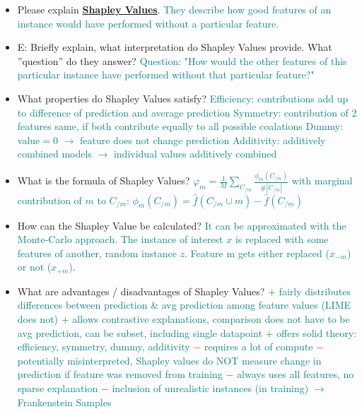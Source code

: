 \documentclass{report}
\newcommand{\asw}[2][teal]{}
\renewcommand{\asw}[2][teal]{\textcolor{#1}{#2}}
\begin{document}
\begin{itemize}
	\item Please explain \textbf{\underline{Shapley Values}}.
	\asw{\newline They describe how good features of an instance would have performed without a particular feature.}
	\item E: Briefly explain, what interpretation do Shapley Values provide. What ”question” do they answer?
	\asw{\newline Question: "How would the other features of this particular instance have performed without that particular feature?"}
	\item What properties do Shapley Values satisfy?
	\asw{\newline Efficiency: contributions add up to difference of prediction and average prediction
		\newline Symmetry: contribution of 2 features same, if both contribute equally to all possible coalations
		\newline Dummy: value$=0$ $\rightarrow$ feature does not change prediction
		\newline Additivity: additively combined models $\rightarrow$ individual values additively combined}
	\item What is the formula of Shapley Values?
	\asw{\newline $\varphi_m = \frac{1}{M} \sum_{C_{/m}} \frac{\phi_m(C_{/m})}{\#|C_{/m}|}$
		\newline with marginal contribution of $m$ to $C_{/m}$: $\phi_m(C_{/m}) = \hat{f}(C_{/m} \cup m) - \hat{f}(C_{/m})$}
	\item How can the Shapley Value be calculated?
	\asw{\newline It can be approximated with the Monte-Carlo approach. The instance of interest $x$ is replaced with some features of another, random instance $z$. Feature m gets either replaced ($x_{-m}$) or not ($x_{+m}$)}.
	\item What are advantages / disadvantages of Shapley Values?
	\asw{\newline \textcolor{green}{$+$} fairly distributes differences between prediction \& avg prediction among feature values (LIME does not)
		\newline \textcolor{green}{$+$} allows contrastive explanations, comparison does not have to be avg prediction, can be subset, including single datapoint
		\newline \textcolor{green}{$+$} offers solid theory: efficiency, symmetry, dummy, additivity
		\newline \textcolor{red}{$-$} requires a lot of compute
		\newline \textcolor{red}{$-$} potentially misinterpreted, Shapley values do NOT measure change in prediction if feature was removed from training
		\newline \textcolor{red}{$-$} always uses all features, no sparse explanation
		\newline \textcolor{red}{$-$} inclusion of unrealistic instances (in training) $\rightarrow$ Frankenstein Samples}
	

\end{itemize}
\end{document}
